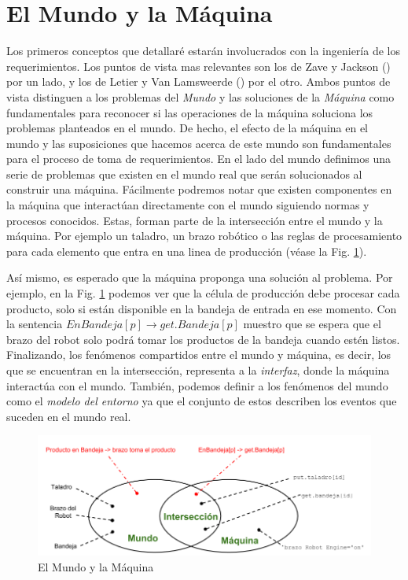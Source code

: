 \section{El Mundo y la Máquina}

Los primeros conceptos que detallaré estarán involucrados con la ingeniería de los requerimientos. Los puntos de vista
mas relevantes son los de Zave y Jackson (\cite{Zave97fourdark, Jackson:1995:SRA:210207, 5071113}) por un lado, y los de
Letier y Van Lamsweerde (\cite{879820, VanLamsweerde:2001:GRE:882477.883624}) por el otro. Ambos puntos de vista
distinguen a los problemas del \emph{Mundo} y las soluciones de la \emph{Máquina} como fundamentales para reconocer si 
las operaciones de la máquina soluciona los problemas planteados en el mundo. De hecho, el efecto de la máquina en el mundo y las
suposiciones que hacemos acerca de este mundo son fundamentales para el proceso de toma de requerimientos. En el lado
del mundo definimos una serie de problemas que existen en el mundo real que serán solucionados al construir una máquina.
Fácilmente podremos notar que existen componentes en la máquina que interactúan directamente con el mundo siguiendo
normas y procesos conocidos. Estas, forman parte de la intersección entre el mundo y la máquina. Por ejemplo un taladro,
un brazo robótico o las reglas de procesamiento para cada elemento que entra en una linea de producción (véase la Fig.
\ref{world_and_machine}).

Así mismo, es esperado que la máquina proponga una solución al problema. Por ejemplo, en la Fig. \ref{world_and_machine}
podemos ver que la célula de producción debe procesar cada producto, solo si están disponible en la bandeja de entrada en ese
momento. Con la sentencia $EnBandeja[p] \rightarrow get.Bandeja[p]$ muestro que se espera que el brazo del robot solo
podrá tomar los productos de la bandeja cuando estén listos. Finalizando, los fenómenos compartidos entre el mundo y
máquina, es decir, los que se encuentran en la intersección, representa a la \emph{interfaz}, donde la máquina
interactúa con el mundo. También, podemos definir a los fenómenos del mundo como el \emph{modelo del entorno} ya que el
conjunto de estos describen los eventos que suceden en el mundo real.

\begin{figure}
    \centering
    \includegraphics[scale=0.45]{img/world_and_machine.png}
    \caption{El Mundo y la Máquina}
    \label{world_and_machine}
\end{figure}



